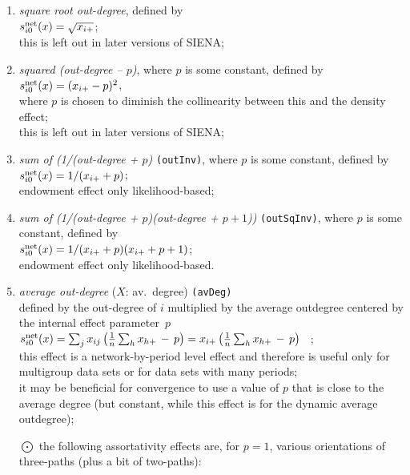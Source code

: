 \documentclass[a4paper,fleqn,11pt]{article}
\newcommand{\+}{\, + \,}
\newcommand{\si}{{\sf SIENA}}
\newcommand{\vit}{\theenumi}
\begin{document}
\begin{enumerate}
 \item {\em square root out-degree}, defined by  \\
 $s^{\rm net}_{i\vit}(x) = \sqrt{x_{i+}}$;\\
 this is left out in later versions of \si;

 \item {\em squared (out-degree -- $p$)}, where $p$ is some constant,
 defined by  \\
 $s^{\rm net}_{i\vit}(x) = (x_{i+} - p)^2$,\\
 where $p$ is chosen to diminish the collinearity between this
 and the density effect;\\
 this is left out in later versions of \si;

 \item {\em sum of (1/(out-degree + $p$)} \texttt{(outInv)},
 where $p$ is some constant,  defined by  \\
 $s^{\rm net}_{i\vit}(x) = 1/(x_{i+} + p)$;\\
 endowment effect only likelihood-based;

 \item {\em sum of (1/(out-degree + $p$)(out-degree + $p+1$))} \texttt{(outSqInv)},
 where $p$ is some constant, defined by  \\
 $s^{\rm net}_{i\vit}(x) = 1/(x_{i+} + p)(x_{i+} + p + 1)$;\\
 endowment effect only likelihood-based.

 \item {\em average out-degree} ($X$: av.\ degree) \texttt{(avDeg)}\\
 defined by the out-degree of $i$ multiplied by the
 average outdegree centered by the internal effect parameter~$p$\\[0.2em]
 $s^{\rm net}_{i\vit}(x) =  \sum_j x_{ij}\, \big( \frac 1n \sum_h  {x_{h+}} \,-\, p \big)=
                           x_{i+}\, \big( \frac 1n \sum_h x_{h+} \,-\, p \big) $ \, ;\\[0.2em]
  this effect is a network-by-period level effect and therefore is useful only
  for multigroup data sets or for data sets with many periods;\\
  it may be beneficial for convergence to use a value of $p$ that is
  close to the average degree (but constant, while this effect
  is for the dynamic average outdegree);

 \item[{\hspace*{-1ex}$\bigodot$}] the following assortativity effects are,
 for $p=1$, various orientations of three-paths (plus a bit of two-paths):\\


\end{enumerate}
\end{document}
